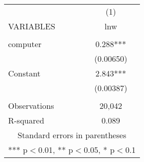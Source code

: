 \begin{tabular}{lc} \hline
 & (1) \\
VARIABLES & lnw \\ \hline
 &  \\
computer & 0.288*** \\
 & (0.00650) \\
Constant & 2.843*** \\
 & (0.00387) \\
 &  \\
Observations & 20,042 \\
 R-squared & 0.089 \\ \hline
\multicolumn{2}{c}{ Standard errors in parentheses} \\
\multicolumn{2}{c}{ *** p$<$0.01, ** p$<$0.05, * p$<$0.1} \\
\end{tabular}
